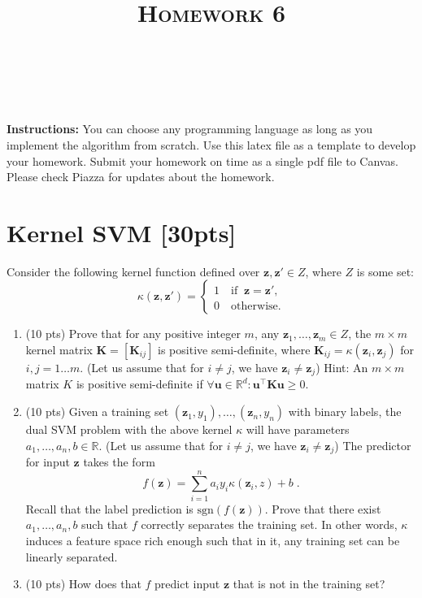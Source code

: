 \documentclass[a4paper]{article}
\title{\textsc{Homework 6}} %
\author{
\red{$>>$NAME HERE$<<$} \\
\red{$>>$ID HERE$<<$}\\
}
\date{}
\theoremstyle{definition}
\def\R{\mathbb R}
\begin{document}
\maketitle 


\textbf{Instructions:} 
You can choose any programming language as long as you implement the algorithm from scratch. Use this latex file as a template to develop your homework.
Submit your homework on time as a single pdf file to Canvas.
Please check Piazza for updates about the homework.\\


\section{Kernel SVM [30pts]}
Consider the following kernel function defined over $\mathbf z,\mathbf z'\in Z$, where $Z$ is some set:
\[
\kappa(\mathbf z,\mathbf z')=\begin{cases}
    1 \quad \mathrm{if }\;\; \mathbf z=\mathbf z',\\
0\quad \mathrm{otherwise}.
\end{cases}
\]
\begin{enumerate}
    \item (10 pts) Prove that for any positive integer $m$, any $\mathbf z_1, \ldots,\mathbf z_m \in Z$, the $m\times m$ kernel matrix $\mathbf K = [\mathbf K_{ij} ]$ is
positive semi-definite, where $\mathbf K_{ij} = \kappa(\mathbf z_i
, \mathbf z_j )$ for $i, j = 1 \ldots m$. (Let us assume that for $i \neq j$, we have
$\mathbf z_i \neq \mathbf z_j$) Hint: An  $m\times m$  matrix $K $ is positive semi-definite if  $\forall \mathbf u\in \R^d: \mathbf u^\top \mathbf K\mathbf u\geq 0$.
\item (10 pts) Given a training set $(\mathbf z_1, y_1), \ldots,(\mathbf z_n, y_n)$ with binary labels, the dual SVM problem with the above
kernel $\kappa$ will have parameters $a_1, \ldots, a_n,b \in \R$. (Let us assume that for $i \neq j$, we have
$\mathbf z_i \neq \mathbf z_j$) The predictor
for input $\mathbf z$ takes the form
\[
f(\mathbf z)=\sum_{i=1}^na_iy_i\kappa(\mathbf z_i,z) +b\;.
\]
Recall that the label prediction is $\mathrm{sgn}(f(\mathbf z))$. Prove that there exist $a_1, \ldots, a_n, b$ such that $f$ correctly separates
the training set. In other words, $\kappa$ induces a feature space rich enough such that in it, any training set can be linearly separated.
\item (10 pts) How does that $f$ predict input $\mathbf z$ that is not in the training set?
\end{enumerate}
\end{document}
